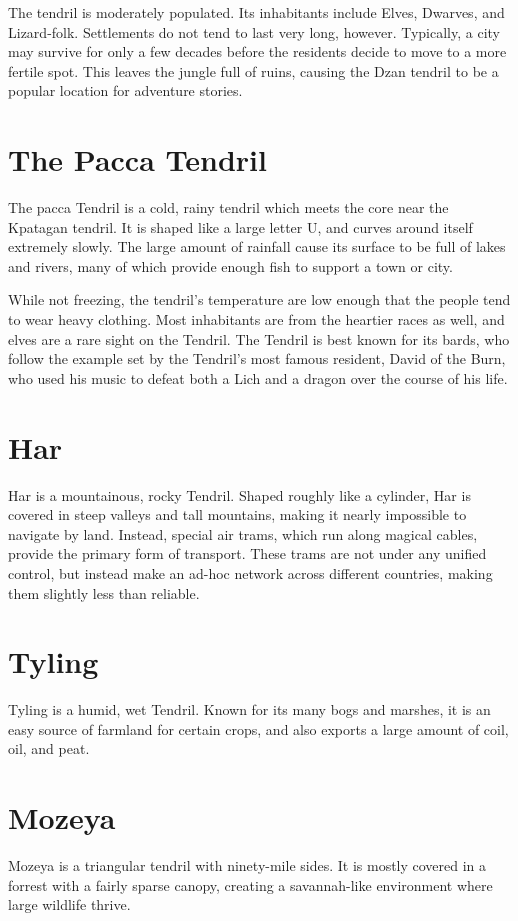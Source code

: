 \begin{multicols}{2}
The tendril is moderately populated.
Its inhabitants include Elves, Dwarves, and Lizard-folk.
Settlements do not tend to last very long, however.
Typically, a city may survive for only a few decades before the residents decide to move to a more fertile spot.
This leaves the jungle full of ruins, causing the Dzan tendril to be a popular location for adventure stories.
\section{The Pacca Tendril}
The pacca Tendril is a cold, rainy tendril which meets the core near the Kpatagan tendril.
It is shaped like a large letter U, and curves around itself extremely slowly.
The large amount of rainfall cause its surface to be full of lakes and rivers, many of which provide enough fish to support a town or city.

While not freezing, the tendril's temperature are low enough that the people tend to wear heavy clothing.
Most inhabitants are from the heartier races as well, and elves are a rare sight on the Tendril.
The Tendril is best known for its bards, who follow the example set by the Tendril's most famous resident, David of the Burn, who used his music to defeat both a Lich and a dragon over the course of his life.

\section{Har}
Har is a mountainous, rocky Tendril.
Shaped roughly like a cylinder, Har is covered in steep valleys and tall mountains, making it nearly impossible to navigate by land.
Instead, special air trams, which run along magical cables, provide the primary form of transport.
These trams are not under any unified control, but instead make an ad-hoc network across different countries, making them slightly less than reliable.

\section{Tyling}
Tyling is a humid, wet Tendril.
Known for its many bogs and marshes, it is an easy source of farmland for certain crops, and also exports a large amount of coil, oil, and peat.

\section{Mozeya}
Mozeya is a triangular tendril with ninety-mile sides.
It is mostly covered in a forrest with a fairly sparse canopy, creating a savannah-like environment where large wildlife thrive.


\end{multicols}
